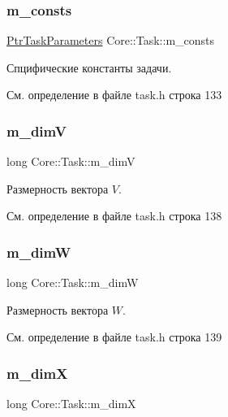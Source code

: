 \subsubsection{\texorpdfstring{m\+\_\+consts}{m\_consts}}
{\footnotesize\ttfamily \hyperlink{namespace_core_a3e0e555656bf795146ebb0882e28da2f}{Ptr\+Task\+Parameters} Core\+::\+Task\+::m\+\_\+consts\hspace{0.3cm}{\ttfamily [protected]}}

Спцифические константы задачи. 

См. определение в файле task.\+h строка 133

\hypertarget{class_core_1_1_task_a2b117926018d3463708aa6e8657766b3}{}\label{class_core_1_1_task_a2b117926018d3463708aa6e8657766b3} 
\subsubsection{\texorpdfstring{m\+\_\+dimV}{m\_dimV}}
{\footnotesize\ttfamily long Core\+::\+Task\+::m\+\_\+dimV\hspace{0.3cm}{\ttfamily [protected]}}

Размерность вектора $V$. 

См. определение в файле task.\+h строка 138

\hypertarget{class_core_1_1_task_a873b2d4f0d94068f327a18483a4c5318}{}\label{class_core_1_1_task_a873b2d4f0d94068f327a18483a4c5318} 
\subsubsection{\texorpdfstring{m\+\_\+dimW}{m\_dimW}}
{\footnotesize\ttfamily long Core\+::\+Task\+::m\+\_\+dimW\hspace{0.3cm}{\ttfamily [protected]}}

Размерность вектора $W$. 

См. определение в файле task.\+h строка 139

\hypertarget{class_core_1_1_task_a3314c516035accea22900aede28ee64b}{}\label{class_core_1_1_task_a3314c516035accea22900aede28ee64b} 
\subsubsection{\texorpdfstring{m\+\_\+dimX}{m\_dimX}}
{\footnotesize\ttfamily long Core\+::\+Task\+::m\+\_\+dimX\hspace{0.3cm}{\ttfamily [protected]}}

